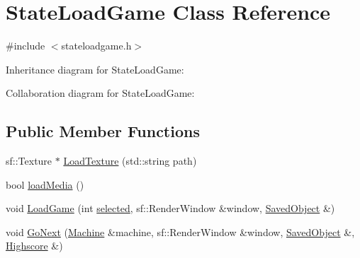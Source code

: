 \hypertarget{classStateLoadGame}{}\section{State\+Load\+Game Class Reference}
\label{classStateLoadGame}


{\ttfamily \#include $<$stateloadgame.\+h$>$}



Inheritance diagram for State\+Load\+Game\+:


Collaboration diagram for State\+Load\+Game\+:
\subsection*{Public Member Functions}
\begin{DoxyCompactItemize}
\item 
sf\+::\+Texture $\ast$ \hyperlink{classStateLoadGame_a18f6bf432f7d4c100728d337f6fbdfaa}{Load\+Texture} (std\+::string path)
\item 
bool \hyperlink{classStateLoadGame_a380d85c22e9abe790493b79e2f08d12a}{load\+Media} ()
\item 
void \hyperlink{classStateLoadGame_ad1d1669028dea4232820597f367bbed8}{Load\+Game} (int \hyperlink{classStateLoadGame_adcf08bbcda5c396a52d513e9576f2b23}{selected}, sf\+::\+Render\+Window \&window, \hyperlink{classSavedObject}{Saved\+Object} \&)
\item 
void \hyperlink{classStateLoadGame_ab84803552d0e19c36c8031e9f24f8e34}{Go\+Next} (\hyperlink{classMachine}{Machine} \&machine, sf\+::\+Render\+Window \&window, \hyperlink{classSavedObject}{Saved\+Object} \&, \hyperlink{classHighscore}{Highscore} \&)
\end{DoxyCompactItemize}
